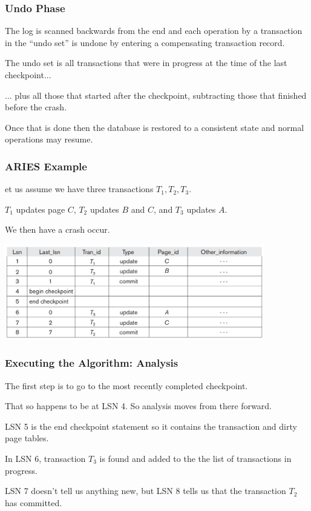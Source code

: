 \begin{frame}
\frametitle{Undo Phase}

The log is scanned backwards from the end and each operation by a transaction in the ``undo set'' is undone by entering a compensating transaction record. 

The undo set is all transactions that were in progress at the time of the last checkpoint...

... plus all those that started after the checkpoint, subtracting those that finished before the crash.

Once that is done then the database is restored to a consistent state and normal operations may resume. 

\end{frame}


\begin{frame}
\frametitle{ARIES Example}

et us assume we have three transactions $T_{1}, T_{2}, T_{3}$. 

$T_{1}$ updates page $C$, $T_{2}$ updates $B$ and $C$, and $T_{3}$ updates $A$. 

We then have a crash occur.

\begin{center}
\includegraphics[width=0.85\textwidth]{images/aries-1}
\end{center}

\end{frame}

\begin{frame}
\frametitle{Executing the Algorithm: Analysis}

The first step is to go to the most recently completed checkpoint. 

That so happens to be at LSN 4. So analysis moves from there forward. 

LSN 5 is the end checkpoint statement so it contains the transaction and dirty page tables. 

In LSN 6, transaction $T_{3}$ is found and added to the the list of transactions in progress. 

LSN 7 doesn't tell us anything new, but LSN 8 tells us that the transaction $T_{2}$ has committed. 

\end{frame}



